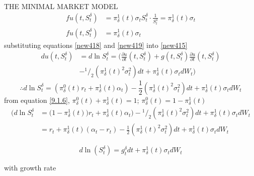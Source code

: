 \documentclass[unknownkeysallowed, compress]{beamer}
\newcommand*\rfrac[2]{{}^{#1}\!/_{#2}}
\theoremstyle{plain}
\begin{document}
\begin{frame}[allowframebreaks]{THE MINIMAL MARKET MODEL}
\begin{equation}\label{new419}
\begin{split}
fu(t,S_t^\delta)& = \pi_\delta^1(t)\sigma_tS_t^\delta\cdot\frac{1}{S_t^\delta} = \pi_\delta^1(t)\sigma_t\\
fu(t,S_t^\delta)& = \pi_\delta^1(t)\sigma_t
\end{split}
\end{equation}
substituting  equations \eqref{new418} and \eqref{new419} into \eqref{new415}
\begin{align*}
du(t,S_t^\delta) &= d\ln S_t^\delta = (\frac{\partial u}{\partial t}(t,S_t^\delta)+g(t,S_t^\delta)\frac{\partial u}{\partial t}(t,S_t^\delta)\\
&- \rfrac{1}{2}(\pi^1_\delta(t)^2\sigma_t^2)dt+\pi^1_\delta(t)\sigma_tdW_t)
\end{align*}
$$
\therefore d\ln S_t^\delta = (\pi_\delta^0(t)r_t+\pi_\delta^1(t)\alpha_t) - \frac{1}{2}(\pi^1_\delta(t)^2\sigma_t^2)dt+\pi_\delta^1(t)\sigma_tdW_t
$$
from equation \eqref{9.1.6}, $\pi_\delta^0(t)+\pi_\delta^1(t) = 1$; $\pi_\delta^0(t) = 1-\pi_\delta^1(t)$
\begin{equation}
\begin{split}
\bigg(d\ln S_t^\delta & = \bigg(1-\pi_\delta^1(t)\bigg)r_t+\pi_\delta^1(t)\alpha_t\bigg) - \rfrac{1}{2}(\pi^1_\delta(t)^2\sigma_t^2)dt+\pi_\delta^1(t)\sigma_tdW_t\\
& = r_t+\pi_\delta^1(t)(\alpha_t - r_t)-\frac{1}{2}(\pi_\delta^1(t)^2\sigma^2_t)dt+\pi_\delta^1(t)\sigma_tdW_t
\end{split}
\end{equation}


\begin{equation}\label{9.1.8}
d\ln(S_t^\delta) = g_t^\delta dt+\pi_\delta^1(t)\sigma_tdW_t
\end{equation}

with growth rate


\end{frame}
\end{document}
